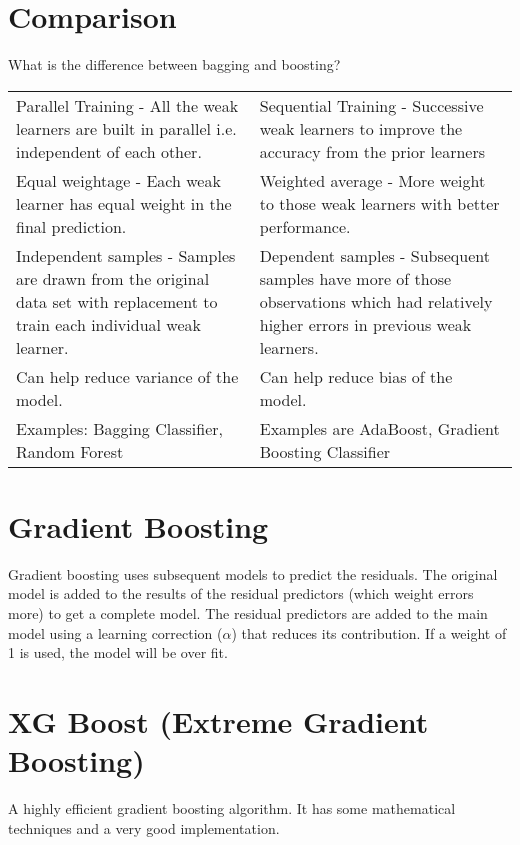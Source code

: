 	\section{Comparison}
What is the difference between bagging and boosting?

	\noindent \begin{tabular}{|p{}|p{}|} \hline
		\tablecolumnheadervlinesone{Bagging} & \tablecolumnheadervlinestwo{Boosting} \\ \hline
		Parallel Training - All the weak learners are built in parallel i.e. independent of each other. &
		Sequential Training - Successive weak learners to improve the accuracy from the prior learners \\ \hline
		Equal weightage - Each weak learner has equal weight in the final prediction. &
		Weighted average - More weight to those weak learners with better performance. \\ \hline
		Independent samples - Samples are drawn from the original data set with replacement to train each individual weak learner. &
		Dependent samples - Subsequent samples have more of those observations which had relatively higher errors in previous weak learners. \\ \hline
		Can help reduce variance of the model. &
		Can help reduce bias of the model. \\ \hline
		Examples: Bagging Classifier, Random Forest &
		Examples are AdaBoost, Gradient Boosting Classifier \\ \hline
	\end{tabular}

	\section{Gradient Boosting}
Gradient boosting uses subsequent models to predict the residuals.  The original model is added to the results of the residual predictors (which weight errors more) to get a complete model.  The residual predictors are added to the main model using a learning correction ($\alpha$) that reduces its contribution.  If a weight of 1 is used, the model will be over fit.

	\section{XG Boost (Extreme Gradient Boosting)}
A highly efficient gradient boosting algorithm.  It has some mathematical techniques and a very good implementation.

